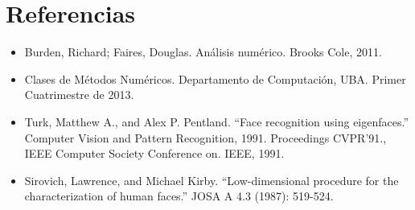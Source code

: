 \section{Referencias}

\begin{itemize}
  \item \nocite {Burden} Burden, Richard; Faires, Douglas. An\'alisis 
num\'erico. Brooks Cole, 2011.
  \item \nocite {MN} Clases de M\'etodos Num\'ericos. Departamento de 
Computaci\'on, UBA. Primer Cuatrimestre de 2013.
\item \nocite {Turk91} Turk, Matthew A., and Alex P. Pentland. ``Face recognition using eigenfaces.'' Computer Vision and Pattern Recognition, 1991. Proceedings CVPR'91., IEEE Computer Society Conference on. IEEE, 1991.
\item \nocite {Sirovich87} Sirovich, Lawrence, and Michael Kirby. ``Low-dimensional procedure for the characterization of human faces.'' JOSA A 4.3 (1987): 519-524.
\end{itemize}
